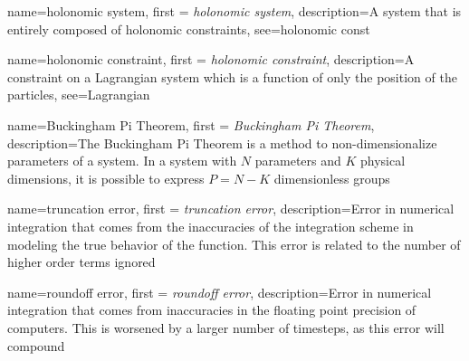 {
    name=holonomic system,
    first = {\textit{holonomic system}},
    description={A system that is entirely composed of holonomic constraints},
    see={holonomic const}
}

{
    name=holonomic constraint,
    first = {\textit{holonomic constraint}},
    description={A constraint on a Lagrangian system which is a function of only the position of the particles},
    see={Lagrangian}
}

{
    name=Buckingham Pi Theorem,
    first = {\textit{Buckingham Pi Theorem}},
    description={The Buckingham Pi Theorem is a method to non-dimensionalize parameters of a system. In a system with $N$ parameters and $K$ physical dimensions, it is possible to express $P=N-K$ dimensionless groups}
}

{
    name=truncation error,
    first = {\textit{truncation error}},
    description={Error in numerical integration that comes from the inaccuracies of the integration scheme in modeling the true behavior of the function. This error is related to the number of higher order terms ignored}
}

{
    name=roundoff error,
    first = {\textit{roundoff error}},
    description={Error in numerical integration that comes from inaccuracies in the floating point precision of computers. This is worsened by a larger number of timesteps, as this error will compound}
}


